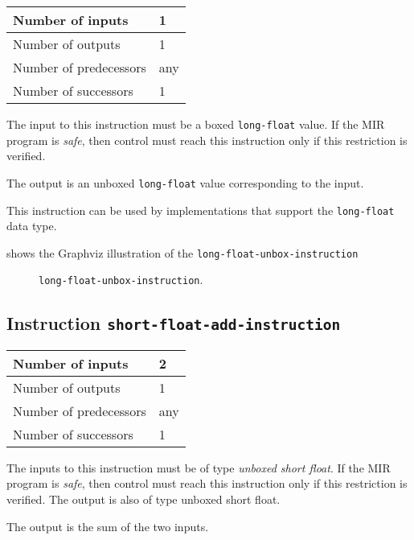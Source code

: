 \begin{tabular}{|l|l|}
\hline
Number of inputs & 1\\
\hline
Number of outputs & 1\\
\hline
Number of predecessors & any\\
\hline
Number of successors & 1\\
\hline
\end{tabular}

The input to this instruction must be a boxed \texttt{long-float}
value.  If the MIR program is \emph{safe}, then control must reach
this instruction only if this restriction is verified.

The output is an unboxed \texttt{long-float} value corresponding to
the input.

This instruction can be used by implementations that support the
\texttt{long-float} data type.   

 shows the Graphviz illustration of the
\texttt{long-float-unbox-instruction}

\begin{figure}
\begin{center}
\end{center}
\caption{\label{fig-long-float-unbox-instruction}
\texttt{long-float-unbox-instruction}.}
\end{figure}

\subsection{Instruction \texttt{short-float-add-instruction}}
\label{mir-instruction-short-float-add}

\begin{tabular}{|l|l|}
\hline
Number of inputs & 2\\
\hline
Number of outputs & 1\\
\hline
Number of predecessors & any\\
\hline
Number of successors & 1\\
\hline
\end{tabular}

The inputs to this instruction must be of type \emph{unboxed short
  float}.  If the MIR program is \emph{safe}, then control must reach
this instruction only if this restriction is verified.  The output is
also of type unboxed short float.

The output is the sum of the two inputs.


